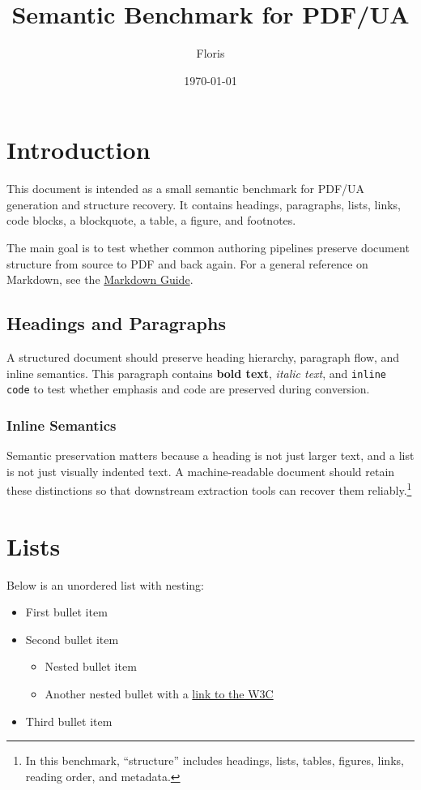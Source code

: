 \documentclass{article}
\title{Semantic Benchmark for PDF/UA}
\author{Floris}
\date{\today}
\begin{document}
\section{Introduction}
This document is intended as a small semantic benchmark for PDF/UA generation and structure recovery. It contains headings, paragraphs, lists, links, code blocks, a blockquote, a table, a figure, and footnotes.

The main goal is to test whether common authoring pipelines preserve document structure from source to PDF and back again. For a general reference on Markdown, see the \href{https://www.markdownguide.org/basic-syntax/}{Markdown Guide}.

\subsection{Headings and Paragraphs}
A structured document should preserve heading hierarchy, paragraph flow, and inline semantics. This paragraph contains \textbf{bold text}, \textit{italic text}, and \texttt{inline code} to test whether emphasis and code are preserved during conversion.

\subsubsection{Inline Semantics}
Semantic preservation matters because a heading is not just larger text, and a list is not just visually indented text. A machine-readable document should retain these distinctions so that downstream extraction tools can recover them reliably.\footnote{In this benchmark, ``structure'' includes headings, lists, tables, figures, links, reading order, and metadata.}

\section{Lists}
Below is an unordered list with nesting:
\begin{itemize}
    \item First bullet item
    \item Second bullet item
    \begin{itemize}
        \item Nested bullet item
        \item Another nested bullet with a \href{https://www.w3.org/}{link to the W3C}
    \end{itemize}
    \item Third bullet item
\end{itemize}
\end{document}
